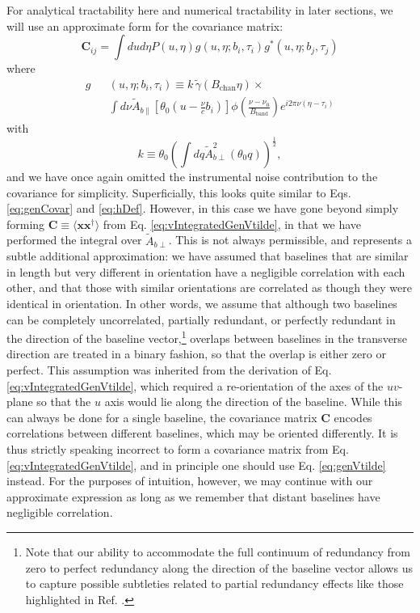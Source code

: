 \documentclass[twocolumn,aps,prd,nofootinbib,showpacs]{revtex4-1}
\begin{document}
For analytical tractability here and numerical tractability in later sections, we will use an approximate form for the covariance matrix:
\begin{equation}
\mathbf{C}_{ij} = \int du d\eta P(u,\eta) g(u, \eta; b_i, \tau_i) g^* (u, \eta; b_j, \tau_j)
\end{equation}
where
\begin{eqnarray}
\label{eq:GeeDef}
g &&(u, \eta; b_i,  \tau_i) \equiv   k \, \widetilde{\gamma}(B_\textrm{chan} \eta) \times \nonumber \\ 
&&  \int d\nu  \widetilde{A}_{b\parallel} \left[ \theta_0 \left( u - \frac{\nu}{c} b_i \right) \right] 
\phi \left( \frac{\nu - \nu_0}{B_\textrm{band}} \right) e^{i 2 \pi \nu (\eta - \tau_i)}
\end{eqnarray}
with
\begin{equation}
k \equiv \theta_0 \left( \int dq \widetilde{A}_{b\perp}^2 (\theta_0 q) \right)^\frac{1}{2},
\end{equation}
and we have once again omitted the instrumental noise contribution to the covariance for simplicity.  Superficially, this looks quite similar to  Eqs. \eqref{eq:genCovar} and \eqref{eq:hDef}.  However, in this case we have gone beyond simply forming $\mathbf{C} \equiv \langle \mathbf{x} \mathbf{x}^\dagger \rangle$ from  Eq. \eqref{eq:vIntegratedGenVtilde}, in that we have performed the integral over $\widetilde{A}_{b\perp}$.  This is not always permissible, and represents a subtle additional approximation: we have assumed that baselines that are similar in length but very different in orientation have a negligible correlation with each other, and that those with similar orientations are correlated as though they were identical in orientation.  In other words, we assume that although two baselines can be completely uncorrelated, partially redundant, or perfectly redundant in the direction of the baseline vector,\footnote{Note that our ability to accommodate the full continuum of redundancy from zero to perfect redundancy along the direction of the baseline vector allows us to capture possible subtleties related to partial redundancy effects like those highlighted in Ref. \cite{Hazelton2013}.} overlaps between baselines in the transverse direction are treated in a binary fashion, so that the overlap is either zero or perfect.  This assumption was inherited from the derivation of  Eq. \eqref{eq:vIntegratedGenVtilde}, which required a re-orientation of the axes of the $uv$-plane so that the $u$ axis would lie along the direction of the baseline.  While this can always be done for a single baseline, the covariance matrix $\mathbf{C}$ encodes correlations between different baselines, which may be oriented differently.  It is thus strictly speaking incorrect to form a covariance matrix from  Eq. \eqref{eq:vIntegratedGenVtilde}, and in principle one should use  Eq. \eqref{eq:genVtilde} instead.  For the purposes of intuition, however, we may continue with our approximate expression as long as we remember that distant baselines have negligible correlation.
\end{document}
